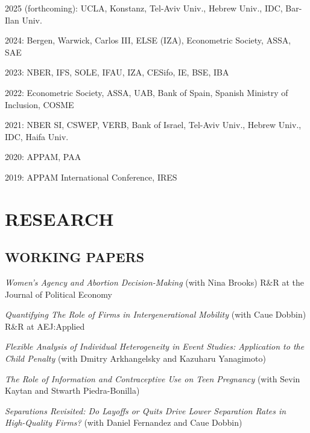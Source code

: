 \documentclass[margin]{res} %
\newcommand{\rootFolder}{/Users/tomzohar/Dropbox/}
\begin{document}
\begin{resume}
 2025 (forthcoming): UCLA, Konstanz, Tel-Aviv Univ., Hebrew Univ., IDC, Bar-Ilan Univ.

 2024: Bergen, Warwick, Carlos III, ELSE (IZA), Econometric Society, ASSA, SAE

 2023: NBER, IFS, SOLE, IFAU, IZA, CESifo, IE, BSE, IBA

 2022: Econometric Society, ASSA, UAB, Bank of Spain, Spanish Ministry of Inclusion, COSME

 2021: NBER SI, CSWEP, VERB, Bank of Israel, Tel-Aviv Univ., Hebrew Univ., IDC, Haifa Univ.

 2020: APPAM, PAA

 2019: APPAM International Conference, IRES


\section{RESEARCH} 

\subsection{WORKING PAPERS}

\textit{Women's Agency and Abortion Decision-Making} (with Nina Brooks) 
R\&R at the Journal of Political Economy

\textit{Quantifying The Role of Firms in Intergenerational Mobility} (with Caue Dobbin) \\
R\&R at AEJ:Applied

%

\textit{Flexible Analysis of Individual Heterogeneity in Event Studies: Application to the Child Penalty} (with Dmitry Arkhangelsky and Kazuharu Yanagimoto)

\textit{The Role of Information and Contraceptive Use on Teen Pregnancy} (with Sevin Kaytan and Stwarth Piedra-Bonilla)

\textit{Separations Revisited: Do Layoffs or Quits Drive Lower Separation Rates in High-Quality Firms?} (with Daniel Fernandez and Caue Dobbin) 




\end{resume}
\end{document}
